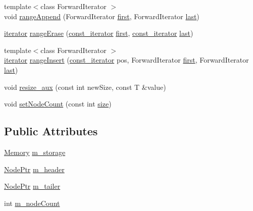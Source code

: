 \begin{DoxyCompactItemize}
{\footnotesize template$<$class Forward\+Iterator $>$ }\\void \hyperlink{structprism_1_1_list_data_a6287815d689b4c67032a071bfc3c158e}{range\+Append} (Forward\+Iterator \hyperlink{namespaceprism_ae3fb7a1926a9e8e59300cd5e370470da}{first}, Forward\+Iterator \hyperlink{namespaceprism_abe4956c4e865f55ca126b7fb973b5078}{last})
\item 
\hyperlink{structprism_1_1_list_data_a4bc53f6312c92f848fe93b2814904cff}{iterator} \hyperlink{structprism_1_1_list_data_a3ba281b60419d04a27d8e86824ab35ab}{range\+Erase} (\hyperlink{structprism_1_1_list_data_adf50481f89392e64eb3de1fbffd20c63}{const\+\_\+iterator} \hyperlink{namespaceprism_ae3fb7a1926a9e8e59300cd5e370470da}{first}, \hyperlink{structprism_1_1_list_data_adf50481f89392e64eb3de1fbffd20c63}{const\+\_\+iterator} \hyperlink{namespaceprism_abe4956c4e865f55ca126b7fb973b5078}{last})
\item 
{\footnotesize template$<$class Forward\+Iterator $>$ }\\\hyperlink{structprism_1_1_list_data_a4bc53f6312c92f848fe93b2814904cff}{iterator} \hyperlink{structprism_1_1_list_data_a8b2163240a9ec7728856e2a24274e9a1}{range\+Insert} (\hyperlink{structprism_1_1_list_data_adf50481f89392e64eb3de1fbffd20c63}{const\+\_\+iterator} pos, Forward\+Iterator \hyperlink{namespaceprism_ae3fb7a1926a9e8e59300cd5e370470da}{first}, Forward\+Iterator \hyperlink{namespaceprism_abe4956c4e865f55ca126b7fb973b5078}{last})
\item 
void \hyperlink{structprism_1_1_list_data_a9f909efa77986c8a6178d4858528e92e}{resize\+\_\+aux} (const int new\+Size, const T \&value)
\item 
void \hyperlink{structprism_1_1_list_data_a38e54307a69b814d694f21350da28f0e}{set\+Node\+Count} (const int \hyperlink{namespaceprism_acd3c0f96adf158a29387191d79c4d874}{size})
\end{DoxyCompactItemize}
\subsection*{Public Attributes}
\begin{DoxyCompactItemize}
\item 
\hyperlink{structprism_1_1_list_data_a6d98e28cb4bb0df40d244e1a9ee372a2}{Memory} \hyperlink{structprism_1_1_list_data_a0a9588fe5613d57dde51fcc5a6fd98fb}{m\+\_\+storage}
\item 
\hyperlink{structprism_1_1_list_data_a6abedadad0342afa083fed664b90d474}{Node\+Ptr} \hyperlink{structprism_1_1_list_data_a3f5e51378a2510e424dcb5b28522eb02}{m\+\_\+header}
\item 
\hyperlink{structprism_1_1_list_data_a6abedadad0342afa083fed664b90d474}{Node\+Ptr} \hyperlink{structprism_1_1_list_data_a9ec1550df72632fa63473f57c7b5bb3c}{m\+\_\+tailer}
\item 
int \hyperlink{structprism_1_1_list_data_a43e4bc056d6706e12940fcb8943bc230}{m\+\_\+node\+Count}
\end{DoxyCompactItemize}


